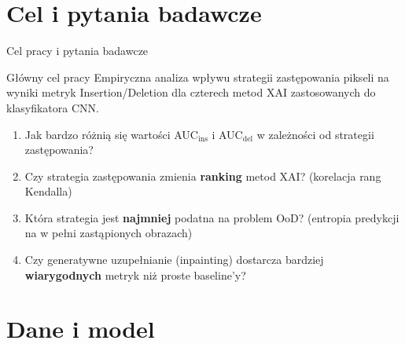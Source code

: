 \documentclass[aspectratio=169, 12pt]{beamer}
\begin{document}
\section{Cel i pytania badawcze}

\begin{frame}{Cel pracy i pytania badawcze}
  \begin{block}{Główny cel pracy}
    Empiryczna analiza wpływu strategii zastępowania pikseli na wyniki
    metryk Insertion/Deletion dla czterech metod XAI zastosowanych do
    klasyfikatora CNN.
  \end{block}

  \vspace{10pt}
  \begin{enumerate}
    \item[\textbf{P1}] Jak bardzo różnią się wartości AUC$_\text{ins}$ i
          AUC$_\text{del}$ w zależności od strategii zastępowania?
    \vspace{4pt}
    \item[\textbf{P2}] Czy strategia zastępowania zmienia \textbf{ranking} metod XAI?
          (korelacja rang Kendalla)
    \vspace{4pt}
    \item[\textbf{P3}] Która strategia jest \textbf{najmniej} podatna na problem OoD?
          (entropia predykcji na w pełni zastąpionych obrazach)
    \vspace{4pt}
    \item[\textbf{P4}] Czy generatywne uzupełnianie (inpainting)
          dostarcza bardziej \textbf{wiarygodnych} metryk niż proste baseline'y?
  \end{enumerate}
\end{frame}

\section{Dane i model}
\end{document}
